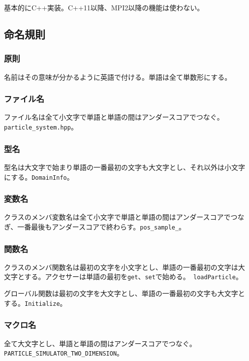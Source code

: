 \documentclass[12pt,a4paper]{jarticle}
\begin{document}
基本的にC++実装。C++11以降、MPI2以降の機能は使わない。

\subsection{命名規則}
\label{sec:naming_rules}

\subsubsection{原則}

名前はその意味が分かるように英語で付ける。単語は全て単数形にする。

\subsubsection{ファイル名}

ファイル名は全て小文字で単語と単語の間はアンダースコアでつなぐ。{\tt
particle\_system.hpp}。

\subsubsection{型名}

型名は大文字で始まり単語の一番最初の文字も大文字とし、それ以外は小文字
にする。{\tt DomainInfo}。

\subsubsection{変数名}

クラスのメンバ変数名は全て小文字で単語と単語の間はアンダースコアでつな
ぎ、一番最後もアンダースコアで終わらす。{\tt pos\_sample\_}。

\subsubsection{関数名}

クラスのメンバ関数名は最初の文字を小文字とし、単語の一番最初の文字は大
文字とする。アクセサーは単語の最初を{\tt get}、{\tt set}で始める。{\tt
loadParticle}。

グローバル関数は最初の文字を大文字とし、単語の一番最初の文字も大文字と
する。{\tt Initialize}。

\subsubsection{マクロ名}

全て大文字とし、単語と単語の間はアンダースコアでつなぐ。{\tt
PARTICLE\_SIMULATOR\_TWO\_DIMENSION}。
\end{document}
